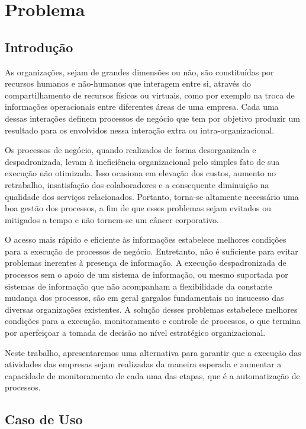 \chapter{Problema}\label{chp:problema}

\section{Introdução}\label{sec:problema-introducao}

As organizações, sejam de grandes dimensões ou não, são constituídas por recursos humanos e não-humanos que interagem entre si, através do compartilhamento de recursos físicos ou virtuais, como por exemplo na troca de informações operacionais entre diferentes áreas de uma empresa. Cada uma dessas interações definem processos de negócio que tem por objetivo produzir um resultado para os envolvidos nessa interação extra ou intra-organizacional.

Os processos de negócio, quando realizados de forma desorganizada e despadronizada, levam à ineficiência organizacional pelo simples fato de sua execução não otimizada. Isso ocasiona em elevação dos custos, aumento no retrabalho, insatisfação dos colaboradores e a consequente diminuição na qualidade dos serviços relacionados. Portanto, torna-se altamente necessário uma boa gestão dos processos, a fim de que esses problemas sejam evitados ou mitigados a tempo e não tornem-se um câncer corporativo.

O acesso mais rápido e eficiente às informações estabelece melhores condições para a execução de processos de negócio. Entretanto, não é suficiente para evitar problemas inerentes à presença de informação. A execução despadronizada de processos sem o apoio de um sistema de informação, ou mesmo suportada por sistemas de informação que não acompanham a flexibilidade da constante mudança dos processos, são em geral gargalos fundamentais no insucesso das diversas organizações existentes. A solução desses problemas estabelece melhores condições para a execução, monitoramento e controle de processos, o que termina por aperfeiçoar a tomada de decisão no nível estratégico organizacional.

Neste trabalho, apresentaremos uma alternativa para garantir que a execução das atividades das empresas sejam realizadas da maneira esperada e aumentar a capacidade de monitoramento de cada uma das etapas, que é a automatização de processos. 

\section{Caso de Uso}\label{sec:problema-caso_de_uso}

